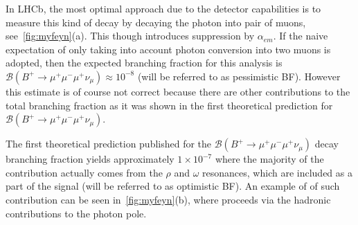 In LHCb, the most optimal approach due to the detector capabilities is to measure this kind of decay by decaying the photon into pair of muons, see~\autoref{fig:myfeyn}(a). This though introduces suppression by $\alpha_{em}$. If the naive expectation of only taking into account photon conversion into two muons is adopted, then the expected branching fraction for this analysis is $\mathcal{B}(B^{+}\rightarrow \mu^{+} \mu^{-} \mu^{+} \nu_{\mu}) \approx 10^{-8}$ (will be referred to as pessimistic BF). However this estimate is of course not correct because there are other contributions to the total branching fraction as it was shown in the first theoretical prediction for $\mathcal{B}(B^{+}\rightarrow \mu^{+} \mu^{-} \mu^{+} \nu_{\mu})$.

The first theoretical prediction published for the $\mathcal{B}(B^{+} \rightarrow \mu^{+} \mu^{-} \mu^{+} \nu_{\mu})$ decay branching fraction\cite{Danilina:2017bcn} yields approximately $1\times 10^{-7}$ where the majority of the contribution actually comes from the $\rho$ and $\omega$ resonances, which are included as a part of the signal (will be referred to as optimistic BF). An example of of such contribution can be seen in~\autoref{fig:myfeyn}(b), where \Bmumumu proceeds via the hadronic contributions to the photon pole.







